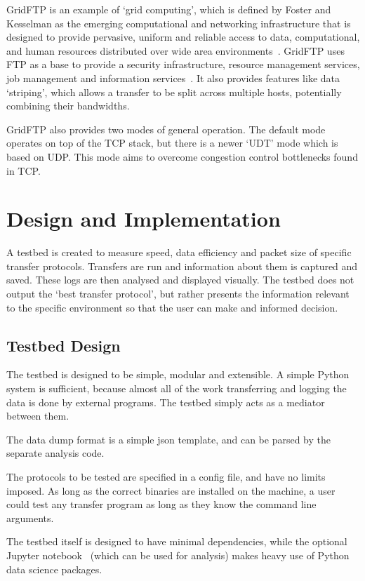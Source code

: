 \documentclass{sig-alternate-05-2015}
\begin{document}
GridFTP is an example of `grid computing', which is defined by Foster and Kesselman as the emerging computational and networking infrastructure that is designed to provide pervasive, uniform and reliable access to data, computational, and human resources distributed over wide area environments~\cite{foster}. GridFTP uses FTP as a base to provide a security infrastructure, resource management services, job management and information services~\cite{allcock2001secure}. It also provides features like data `striping', which allows a transfer to be split across multiple hosts, potentially combining their bandwidths.

GridFTP also provides two modes of general operation. The default mode operates on top of the TCP stack, but there is a newer `UDT' mode which is based on UDP\@. This mode aims to overcome congestion control bottlenecks found in TCP\@. 

\section{Design and Implementation}
A testbed is created to measure speed, data efficiency and packet size of specific transfer protocols. Transfers are run and information about them is captured and saved. These logs are then analysed and displayed visually. The testbed does not output the `best transfer protocol', but rather presents the information relevant to the specific environment so that the user can make and informed decision.

\subsection{Testbed Design}
The testbed is designed to be simple, modular and extensible. A simple Python system is sufficient, because almost all of the work transferring and logging the data is done by external programs. The testbed simply acts as a mediator between them.

The data dump format is a simple json template, and can be parsed by the separate analysis code.

The protocols to be tested are specified in a config file, and have no limits imposed. As long as the correct binaries are installed on the machine, a user could test any transfer program as long as they know the command line arguments.

The testbed itself is designed to have minimal dependencies, while the optional Jupyter notebook~\cite{jupyter} (which can be used for analysis) makes heavy use of Python data science packages.
\end{document}
